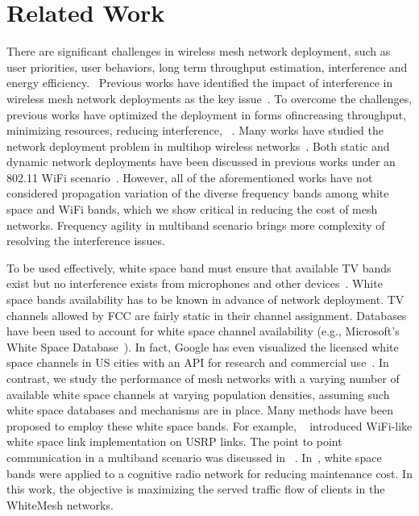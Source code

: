 \section{Related Work}
\label{sec:related}
There are significant challenges in wireless mesh network deployment,
such as user priorities, user behaviors, long term throughput estimation, 
interference and energy efficiency.~\cite{tragos2013spectrum}
Previous works have identified the impact of interference in wireless mesh network 
deployments as the key issue~\cite{tang2005interference,irwin2013resource,chieochan2013channel}.
To overcome the challenges, previous works have optimized the 
deployment in forms ofincreasing throughput, minimizing resources, reducing interference,
~\cite{irwin2013resource,subramanian2008minimum,doraghinejad2014channel}.
Many works have studied the network deployment problem in multihop wireless 
networks~\cite{jain2005impact,akyildiz2005wireless,raniwala2004centralized,tragos2013spectrum}.
Both static and dynamic network deployments have been discussed in previous works under
an 802.11 WiFi scenario~\cite{wu2006analysis,ramachandran2006interference,subramanian2008minimum}. 
However, all of the aforementioned works have not considered propagation variation of the 
diverse frequency bands among white space and WiFi bands, which we show critical in reducing the cost of
mesh networks. Frequency agility in multiband scenario brings more 
complexity of 
resolving the interference issues.

To be used effectively, white space band must ensure that available TV bands
exist but no interference exists from microphones and other devices~\cite{bahl2009white}. 
White space bands availability has to be known in advance of network deployment.
TV channels allowed by FCC are fairly static in their channel assignment. 
Databases have been used to account for white space channel availability 
(e.g., Microsoft's White Space Database~\cite{msdatabase}).
In fact, Google has even visualized the licensed white space channels 
in US cities with an API for research and commercial use~\cite{googledatabase}.
In contrast, we study the performance of mesh networks with a varying number 
of available white space channels at varying population densities, assuming 
such white space databases and mechanisms are in place.  
Many methods have been proposed to employ these white space bands. For example,
~\cite{bahl2009white} introduced WiFi-like white space link implementation on USRP 
links. The point to point communication
in a multiband scenario was discussed in~\cite{cui2013leveraging} . In~\cite{filippini2013new}, white space bands
were applied to a cognitive radio network for reducing maintenance cost. 
In this work, the objective is maximizing the served traffic flow of clients in the WhiteMesh networks.




